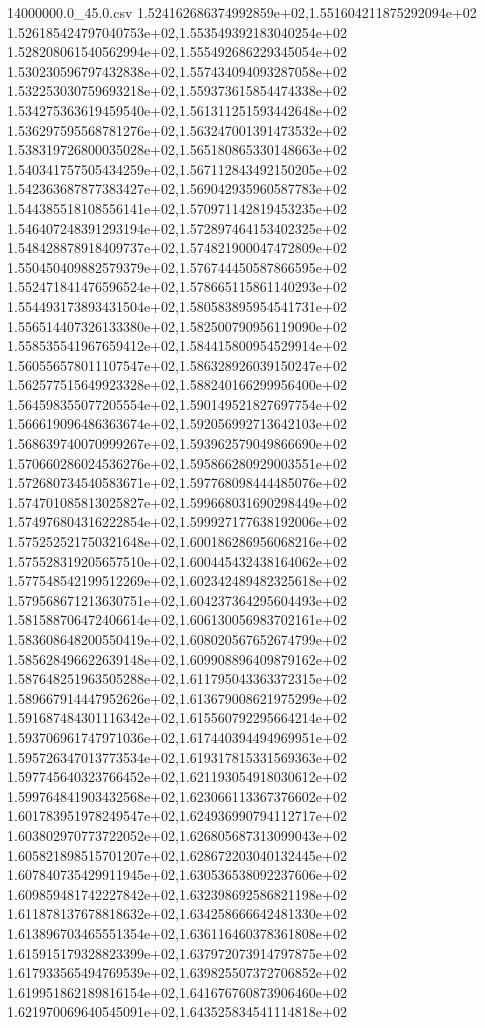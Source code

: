 \begin{filecontents*}{14000000.0_45.0.csv}
1.524162686374992859e+02,1.551604211875292094e+02
1.526185424797040753e+02,1.553549392183040254e+02
1.528208061540562994e+02,1.555492686229345054e+02
1.530230596797432838e+02,1.557434094093287058e+02
1.532253030759693218e+02,1.559373615854474338e+02
1.534275363619459540e+02,1.561311251593442648e+02
1.536297595568781276e+02,1.563247001391473532e+02
1.538319726800035028e+02,1.565180865330148663e+02
1.540341757505434259e+02,1.567112843492150205e+02
1.542363687877383427e+02,1.569042935960587783e+02
1.544385518108556141e+02,1.570971142819453235e+02
1.546407248391293194e+02,1.572897464153402325e+02
1.548428878918409737e+02,1.574821900047472809e+02
1.550450409882579379e+02,1.576744450587866595e+02
1.552471841476596524e+02,1.578665115861140293e+02
1.554493173893431504e+02,1.580583895954541731e+02
1.556514407326133380e+02,1.582500790956119090e+02
1.558535541967659412e+02,1.584415800954529914e+02
1.560556578011107547e+02,1.586328926039150247e+02
1.562577515649923328e+02,1.588240166299956400e+02
1.564598355077205554e+02,1.590149521827697754e+02
1.566619096486363674e+02,1.592056992713642103e+02
1.568639740070999267e+02,1.593962579049866690e+02
1.570660286024536276e+02,1.595866280929003551e+02
1.572680734540583671e+02,1.597768098444485076e+02
1.574701085813025827e+02,1.599668031690298449e+02
1.574976804316222854e+02,1.599927177638192006e+02
1.575252521750321648e+02,1.600186286956068216e+02
1.575528319205657510e+02,1.600445432438164062e+02
1.577548542199512269e+02,1.602342489482325618e+02
1.579568671213630751e+02,1.604237364295604493e+02
1.581588706472406614e+02,1.606130056983702161e+02
1.583608648200550419e+02,1.608020567652674799e+02
1.585628496622639148e+02,1.609908896409879162e+02
1.587648251963505288e+02,1.611795043363372315e+02
1.589667914447952626e+02,1.613679008621975299e+02
1.591687484301116342e+02,1.615560792295664214e+02
1.593706961747971036e+02,1.617440394494969951e+02
1.595726347013773534e+02,1.619317815331569363e+02
1.597745640323766452e+02,1.621193054918030612e+02
1.599764841903432568e+02,1.623066113367376602e+02
1.601783951978249547e+02,1.624936990794112717e+02
1.603802970773722052e+02,1.626805687313099043e+02
1.605821898515701207e+02,1.628672203040132445e+02
1.607840735429911945e+02,1.630536538092237606e+02
1.609859481742227842e+02,1.632398692586821198e+02
1.611878137678818632e+02,1.634258666642481330e+02
1.613896703465551354e+02,1.636116460378361808e+02
1.615915179328823399e+02,1.637972073914797875e+02
1.617933565494769539e+02,1.639825507372706852e+02
1.619951862189816154e+02,1.641676760873906460e+02
1.621970069640545091e+02,1.643525834541114818e+02

\end{filecontents*}
